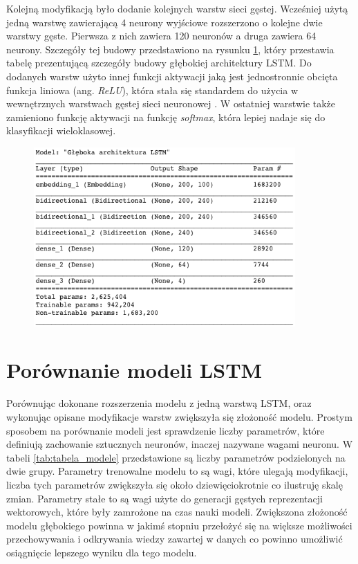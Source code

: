 Kolejną modyfikacją było dodanie kolejnych warstw sieci gęstej. Wcześniej użytą jedną warstwę zawierającą 4 neurony wyjściowe rozszerzono o kolejne dwie warstwy gęste. Pierwsza z nich zawiera 120 neuronów a druga zawiera 64 neurony. Szczegóły tej budowy przedstawiono na rysunku \ref{rys:lstm_deep_table}, który przestawia tabelę prezentującą szczegóły budowy głębokiej architektury LSTM. Do dodanych warstw użyto innej funkcji aktywacji jaką jest jednostronnie obcięta funkcja liniowa (ang. \textit{ReLU}), która stała się standardem do użycia w wewnętrznych warstwach gęstej sieci neuronowej \cite{xu2015empirical}. W ostatniej warstwie także zamieniono funkcję aktywacji na funkcję \textit{softmax}, która lepiej nadaje się do klasyfikacji wieloklasowej.

\begin{figure}[t]
\centering\includegraphics[width=10cm]{figures/reports/lstm_deep_table.png}
\label{rys:lstm_deep_table}
\end{figure}

\section{Porównanie modeli LSTM}

Porównując dokonane rozszerzenia modelu z jedną warstwą LSTM, oraz wykonując opisane modyfikacje warstw zwiększyła się złożoność modelu. Prostym sposobem na porównanie modeli jest sprawdzenie liczby parametrów, które definiują zachowanie sztucznych neuronów, inaczej nazywane wagami neuronu. W tabeli \ref{tab:tabela_modele} przedstawione są liczby parametrów podzielonych na dwie grupy. Parametry trenowalne modelu to są wagi, które ulegają modyfikacji, liczba tych parametrów zwiększyła się około dziewięciokrotnie co ilustruję skalę zmian. Parametry stałe to są wagi użyte do generacji gęstych reprezentacji wektorowych, które były zamrożone na czas nauki modeli. Zwiększona złożoność modelu głębokiego powinna w jakimś stopniu przełożyć się na większe możliwości przechowywania i odkrywania wiedzy zawartej w danych co powinno umożliwić osiągnięcie lepszego wyniku dla tego modelu.

